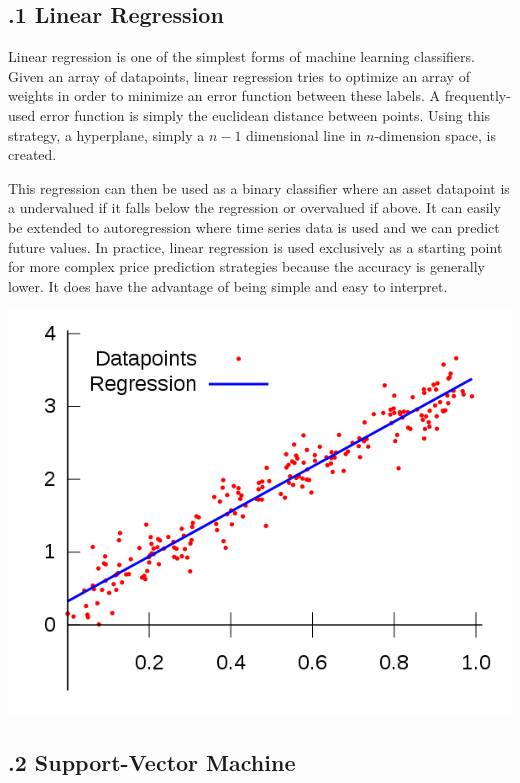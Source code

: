 \documentclass[12pt]{report}
\begin{document}
\subsection*{.1 Linear Regression}

Linear regression is one of the simplest forms of machine learning classifiers. Given an array of datapoints, linear regression tries to optimize an array of weights in order to minimize an error function between these labels. A frequently-used error function is simply the euclidean distance between points. Using this strategy, a hyperplane, simply a $n-1$ dimensional line in $n$-dimension space, is created.

This regression can then be used as a binary classifier where an asset datapoint is a undervalued if it falls below the regression or overvalued if above.  It can easily be extended to autoregression where time series data is used and we can predict future values. In practice, linear regression is used exclusively as a starting point for more complex price prediction strategies because the accuracy is generally lower. It does have the advantage of being simple and easy to interpret.

\begin{center}
\includegraphics[scale=0.5]{linearregression}
\end{center}

\subsection*{.2 Support-Vector Machine}
\end{document}

